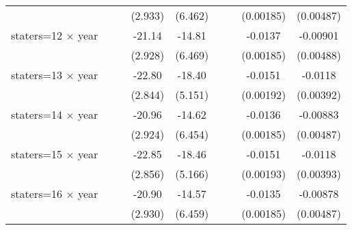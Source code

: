 {\begin{longtable}{l*{8}{c}}
                    &                     &                     &     (2.933)         &     (6.462)         &                     &                     &   (0.00185)         &   (0.00487)         \\
[1em]
staters=12 $\times$ year&                     &                     &      -21.14\sym{***}&      -14.81\sym{**} &                     &                     &     -0.0137\sym{***}&    -0.00901\sym{*}  \\
                    &                     &                     &     (2.928)         &     (6.469)         &                     &                     &   (0.00185)         &   (0.00488)         \\
[1em]
staters=13 $\times$ year&                     &                     &      -22.80\sym{***}&      -18.40\sym{***}&                     &                     &     -0.0151\sym{***}&     -0.0118\sym{***}\\
                    &                     &                     &     (2.844)         &     (5.151)         &                     &                     &   (0.00192)         &   (0.00392)         \\
[1em]
staters=14 $\times$ year&                     &                     &      -20.96\sym{***}&      -14.62\sym{**} &                     &                     &     -0.0136\sym{***}&    -0.00883\sym{*}  \\
                    &                     &                     &     (2.924)         &     (6.454)         &                     &                     &   (0.00185)         &   (0.00487)         \\
[1em]
staters=15 $\times$ year&                     &                     &      -22.85\sym{***}&      -18.46\sym{***}&                     &                     &     -0.0151\sym{***}&     -0.0118\sym{***}\\
                    &                     &                     &     (2.856)         &     (5.166)         &                     &                     &   (0.00193)         &   (0.00393)         \\
[1em]
staters=16 $\times$ year&                     &                     &      -20.90\sym{***}&      -14.57\sym{**} &                     &                     &     -0.0135\sym{***}&    -0.00878\sym{*}  \\
                    &                     &                     &     (2.930)         &     (6.459)         &                     &                     &   (0.00185)         &   (0.00487)         \\

\end{longtable}}
